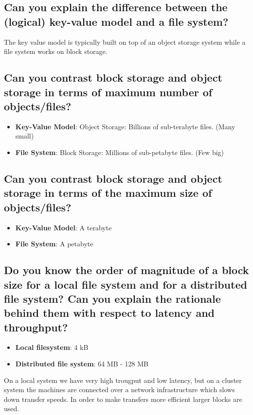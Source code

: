 \documentclass{article}
\begin{document}
\subsection{Can you explain the difference between the (logical) key-value model and a file system?}

The key value model is typically built on top of an object storage system while a file system works on block storage. 

\subsection{Can you contrast block storage and object storage in terms of maximum number of objects/files?}

\begin{itemize}
    \item \textbf{Key-Value Model}: Object Storage: Billions of sub-terabyte files. (Many small)
    \item \textbf{File System}: Block Storage: Millions of sub-petabyte files. (Few big)
\end{itemize}

\subsection{Can you contrast block storage and object storage in terms of the maximum size of objects/files?}

\begin{itemize}
    \item \textbf{Key-Value Model}: A terabyte
    \item \textbf{File System}: A petabyte
\end{itemize}

\subsection{Do you know the order of magnitude of a block size for a local file system and for a distributed file system? Can you explain the rationale behind them with respect to latency and throughput?}

\begin{itemize}
    \item \textbf{Local filesystem}: 4 kB
    \item \textbf{Distributed file system}: 64 MB - 128 MB
\end{itemize}

On a local system we have very high trougput and low latency, but on a cluster system the machines are connected over a network infrastructure which slows down transfer speeds. In order to make transfers more efficient larger blocks are used. 
\end{document}
